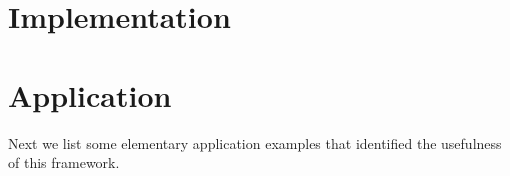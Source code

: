 \documentclass[sigconf,preprint]{acmart}
\begin{document}






% 

%















\section{Implementation}






















%

%

\section{Application}

Next we list some elementary application examples that identified the
usefulness of this framework.









% 









%
\end{document}
